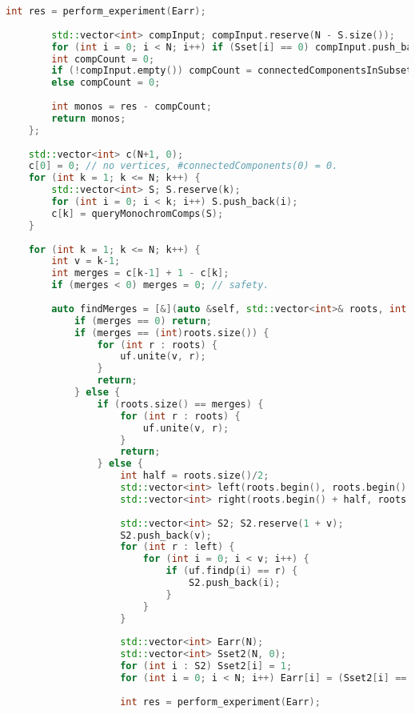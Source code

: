 \begin{lstlisting}[language=C++]
        int res = perform_experiment(Earr);
 
        std::vector<int> compInput; compInput.reserve(N - S.size());
        for (int i = 0; i < N; i++) if (Sset[i] == 0) compInput.push_back(i);
        int compCount = 0;
        if (!compInput.empty()) compCount = connectedComponentsInSubset(compInput);
        else compCount = 0;
 
        int monos = res - compCount;
        return monos;
    };
 
    std::vector<int> c(N+1, 0);
    c[0] = 0; // no vertices, #connectedComponents(0) = 0.
    for (int k = 1; k <= N; k++) {
        std::vector<int> S; S.reserve(k);
        for (int i = 0; i < k; i++) S.push_back(i);
        c[k] = queryMonochromComps(S);
    }
 
    for (int k = 1; k <= N; k++) {
        int v = k-1;
        int merges = c[k-1] + 1 - c[k];
        if (merges < 0) merges = 0; // safety.
 
        auto findMerges = [&](auto &self, std::vector<int>& roots, int merges) -> void {
            if (merges == 0) return;
            if (merges == (int)roots.size()) {
                for (int r : roots) {
                    uf.unite(v, r);
                }
                return;
            } else {
                if (roots.size() == merges) {
                    for (int r : roots) {
                        uf.unite(v, r);
                    }
                    return;
                } else {
                    int half = roots.size()/2;
                    std::vector<int> left(roots.begin(), roots.begin() + half);
                    std::vector<int> right(roots.begin() + half, roots.end());
 
                    std::vector<int> S2; S2.reserve(1 + v);
                    S2.push_back(v);
                    for (int r : left) {
                        for (int i = 0; i < v; i++) {
                            if (uf.findp(i) == r) {
                                S2.push_back(i);
                            }
                        }
                    }
 
                    std::vector<int> Earr(N);
                    std::vector<int> Sset2(N, 0);
                    for (int i : S2) Sset2[i] = 1;
                    for (int i = 0; i < N; i++) Earr[i] = (Sset2[i] == 1) ? -1 : N;
 
                    int res = perform_experiment(Earr);
 

\end{lstlisting}

